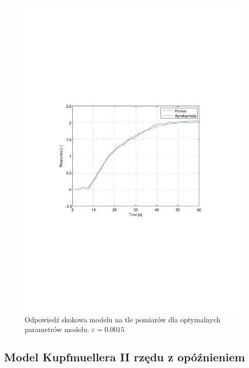 \documentclass[12pt]{article}
\begin{document}
\newpage

\begin{figure}[!htb]
	\begin{center}
		\includegraphics[width=14cm,trim=3cm 9cm 3cm 9cm,clip]
		{../res/img/k1_opt.pdf}
	\end{center}
	\caption{Odpowiedź skokowa modelu na tle pomiarów dla optymalnych parametrów
	modelu. $\varepsilon=0.0015$}
\end{figure}

\newpage

\subsection{Model Kupfmuellera II rzędu z opóźnieniem}
\end{document}
